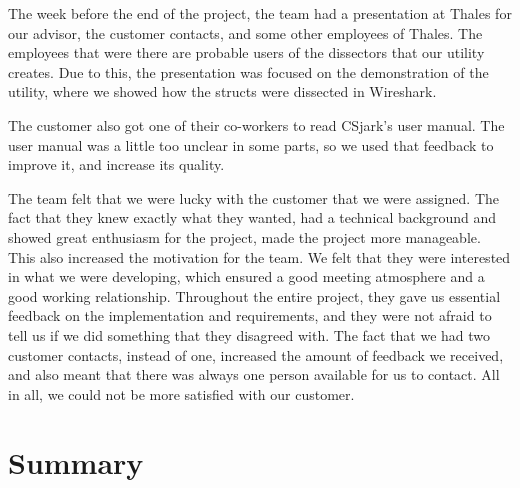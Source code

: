 The week before the end of the project, the team had a presentation at Thales for our advisor, the customer contacts, and some other employees of Thales. The employees that were there are probable users of the dissectors that our utility creates. Due to this, the presentation was focused on the demonstration of the utility, where we showed how the structs were dissected in Wireshark.

The customer also got one of their co-workers to read CSjark's user manual.
The user manual was a little too unclear in some parts, so we used that feedback to improve it, and increase its quality.

The team felt that we were lucky with the customer that we were assigned.
The fact that they knew exactly what they wanted, had a technical background and showed great enthusiasm for the project, made the project more manageable. This also increased the motivation for the team. We felt that they were interested in what we were developing, which ensured a good meeting atmosphere and a good working relationship. Throughout the entire project, they gave us essential feedback on the implementation and requirements, and they were not afraid to tell us if we did something that they disagreed with. The fact that we had two customer contacts, instead of one, increased the amount of feedback we received, and also meant that there was always one person available for us to contact. All in all, we could not be more satisfied with our customer.


\section{Summary}

